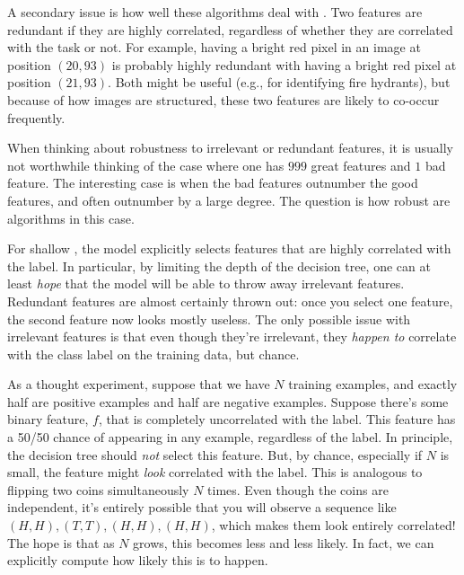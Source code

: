 A secondary issue is how well these algorithms deal with
.  Two features are redundant if they are
highly correlated, regardless of whether they are correlated with the
task or not.  For example, having a bright red pixel in an image at
position $(20,93)$ is probably highly redundant with having a bright
red pixel at position $(21,93)$.  Both might be useful (e.g., for
identifying fire hydrants), but because of how images are structured,
these two features are likely to co-occur frequently.



When thinking about robustness to irrelevant or redundant features, it
is usually not worthwhile thinking of the case where one has $999$
great features and $1$ bad feature.  The interesting case is when the
bad features outnumber the good features, and often outnumber by a
large degree.  %
The
question is how robust are algorithms in this case.

For shallow , the model explicitly selects
features that are highly correlated with the label.  In particular, by
limiting the depth of the decision tree, one can at least \emph{hope}
that the model will be able to throw away irrelevant features.
Redundant features are almost certainly thrown out: once you select
one feature, the second feature now looks mostly useless.  The only
possible issue with irrelevant features is that even though they're
irrelevant, they \emph{happen to} correlate with the class label on
the training data, but chance.

As a thought experiment, suppose that we have $N$ training examples,
and exactly half are positive examples and half are negative
examples.  Suppose there's some binary feature, $f$, that is completely
uncorrelated with the label.  This feature has a 50/50 chance of
appearing in any example, regardless of the label.  In principle, the
decision tree should \emph{not} select this feature.  But, by chance,
especially if $N$ is small, the feature might \emph{look} correlated
with the label.  This is analogous to flipping two coins
simultaneously $N$ times.  Even though the coins are independent, it's
entirely possible that you will observe a sequence like $(H,H), (T,T),
(H,H), (H,H)$, which makes them look entirely correlated!  The hope is
that as $N$ grows, this becomes less and less likely.  In fact, we can
explicitly compute how likely this is to happen.

